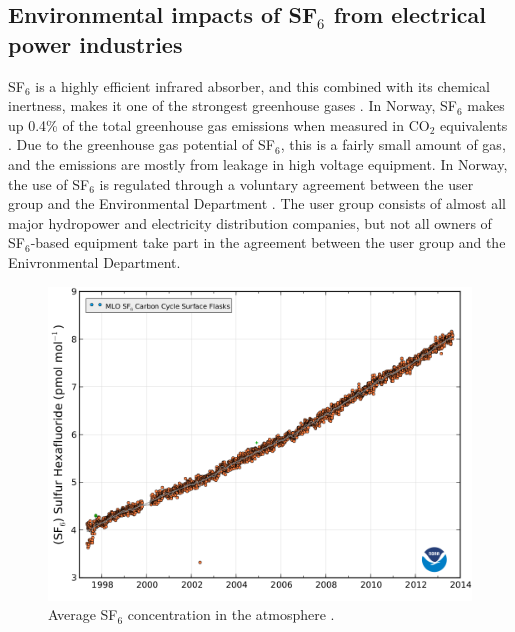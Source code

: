 \documentclass[10pt,a4paper,twoside]{article}
\begin{document}
\subsection{Environmental impacts of SF$_6$ from electrical power industries} \label{sec:EnvirImp}

SF$_6$ is a highly efficient infrared absorber, and this combined with its chemical inertness, makes it one of the strongest greenhouse gases \cite{bib:SF6PI}. In Norway, SF$_6$ makes up 0.4\% of the total greenhouse gas emissions when measured in CO$_2$ equivalents \cite{bib:KlimaKur2020}. Due to the greenhouse gas potential of SF$_6$, this is a fairly small amount of gas, and the emissions are mostly from leakage in high voltage equipment. In Norway, the use of SF$_6$ is regulated through a voluntary agreement between the user group and the Environmental Department \cite{bib:KlimaKur2020}. The user group consists of almost all major hydropower and electricity distribution companies, but not all owners of SF$_6$-based equipment take part in the agreement between the user group and the Enivronmental Department.

\begin{figure}[H]
\centering
\includegraphics[scale=0.25]{Bilder/Theory/consentrationSF6.png}
\caption{Average SF$_6$ concentration in the atmosphere \cite{bib:consSF6}.} \label{fig:conSF6}
\end{figure}
\end{document}
